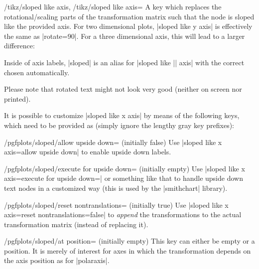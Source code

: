 \begin{pgfplotsxykeylist}{%
    /tikz/sloped like \x\space axis,%
    /tikz/sloped like \x\space axis=%
}
    A key which replaces the rotational/scaling parts of the transformation
    matrix such that the node is sloped like the provided axis. For two
    dimensional plots, |sloped like y axis| is effectively the same as
    |rotate=90|. For a three dimensional axis, this will lead to a larger
    difference:
\pgfplotsexpensiveexample
\begin{codeexample}[]
\end{codeexample}

    Inside of axis labels, |sloped| is an alias for
    |sloped like || axis| with the correct  chosen
    automatically.

    Please note that rotated text might not look very good (neither on screen
    nor printed).

    It is possible to customize |sloped like x axis| by means of the following
    keys, which need to be provided as  (simply ignore the
    lengthy gray key prefixes):
    \begin{key}{/pgfplots/sloped/allow upside down= (initially false)}
        Use |sloped like x axis=allow upside down| to enable upside down labels.
    \end{key}

    \begin{key}{/pgfplots/sloped/execute for upside down= (initially empty)}
        Use |sloped like x axis={execute for upside down=\tikzset{anchor=north}}|
        or something like that to handle upside down text nodes in a customized
        way (this is used by the |smithchart| library).
    \end{key}

    \begin{key}{/pgfplots/sloped/reset nontranslations= (initially true)}
        Use |sloped like x axis={reset nontranslations=false}| to \emph{append}
        the transformations to the actual transformation matrix (instead of
        replacing it).
    \end{key}

    \begin{key}{/pgfplots/sloped/at position= (initially empty)}
        This key can either be empty or a position. It is merely of interest
        for axes in which the transformation depends on the axis position as
        for |polaraxis|.
    \end{key}
\end{pgfplotsxykeylist}


